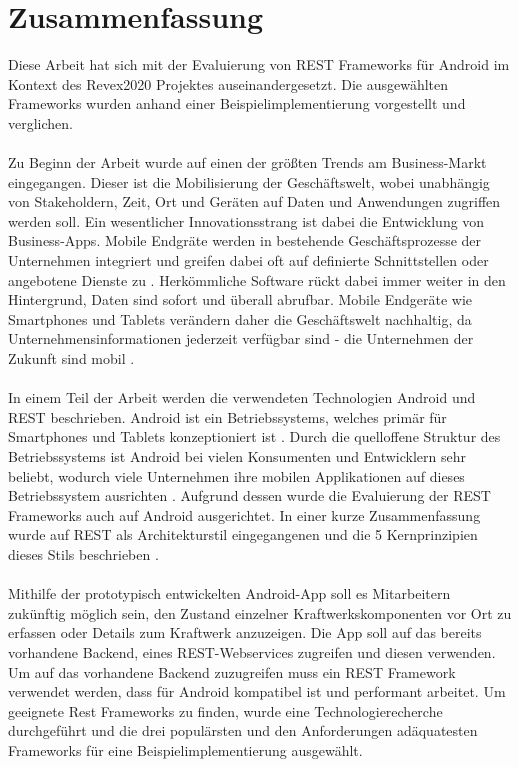 \chapter{Zusammenfassung}
\label{sec:summary}
Diese Arbeit hat sich mit der Evaluierung von REST Frameworks für Android im Kontext des Revex2020 Projektes auseinandergesetzt. Die ausgewählten Frameworks wurden anhand einer Beispielimplementierung vorgestellt und verglichen.
\\\\
Zu Beginn der Arbeit wurde auf einen der größten Trends am Business-Markt eingegangen. Dieser ist die Mobilisierung der Geschäftswelt, wobei unabhängig von Stakeholdern, Zeit, Ort und Geräten auf Daten und Anwendungen zugriffen werden soll. Ein wesentlicher Innovationsstrang ist dabei die Entwicklung von Business-Apps. Mobile Endgräte werden in bestehende Geschäftsprozesse der Unternehmen integriert und greifen dabei oft auf definierte Schnittstellen oder angebotene Dienste zu  \cite{smartMobileApps1}. Herkömmliche Software rückt dabei immer weiter in den Hintergrund, Daten sind sofort und überall abrufbar. Mobile Endgeräte wie Smartphones und Tablets verändern daher die Geschäftswelt nachhaltig, da Unternehmensinformationen jederzeit verfügbar sind - die Unternehmen der Zukunft sind mobil \cite{smartMobileApps7}.
\\\\
In einem Teil der Arbeit werden die verwendeten Technologien Android und REST beschrieben. Android ist ein Betriebssystems, welches primär für Smartphones und Tablets konzeptioniert ist  \cite{overviewAndroid:singh}. Durch die quelloffene Struktur des Betriebssystems ist Android bei vielen Konsumenten und Entwicklern sehr beliebt, wodurch viele Unternehmen ihre mobilen Applikationen auf dieses Betriebssystem ausrichten \cite{statsticMobileOS}. Aufgrund dessen wurde die Evaluierung der REST Frameworks auch auf Android ausgerichtet. In einer kurze Zusammenfassung wurde auf REST als Architekturstil eingegangenen und die 5 Kernprinzipien dieses Stils beschrieben \cite{restHttp:book}.
\\\\
Mithilfe der prototypisch entwickelten Android-App soll es Mitarbeitern zukünftig möglich sein, den Zustand einzelner Kraftwerkskomponenten vor Ort zu erfassen oder Details zum Kraftwerk anzuzeigen. Die App soll auf das bereits vorhandene Backend, eines REST-Webservices zugreifen und diesen verwenden. Um auf das vorhandene Backend zuzugreifen muss ein REST Framework verwendet werden, dass für Android kompatibel ist und performant arbeitet. Um geeignete Rest Frameworks zu finden, wurde eine Technologierecherche durchgeführt und die drei populärsten und den Anforderungen adäquatesten Frameworks für eine Beispielimplementierung ausgewählt.
